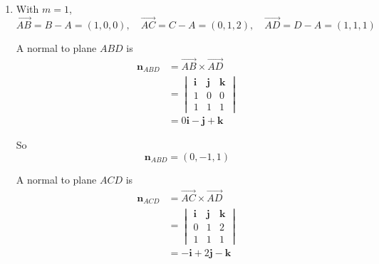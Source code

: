 \documentclass[leqno]{article}
\begin{document}
\begin{enumerate}[
  label=\textbf{\arabic*.},
  leftmargin=*,
  topsep=0pt,
  partopsep=0pt,
  parsep=0pt
]
\begin{tcolorbox}[colback=white, colframe=scarlet, title={\textbf{Solution}}, breakable, grow to left by=6mm, grow to right by=10mm]
\begin{enumerate}[label=\textbf{(\alph*)}]
Now
\begin{align*}
\overrightarrow{AC}\times\overrightarrow{AD}
&=
\begin{vmatrix}
\mathbf i & \mathbf j & \mathbf k\\
0 & 1 & 2\\
1 & 1 & 1
\end{vmatrix} \\
&=\mathbf i(1\cdot 1-2\cdot 1)-\mathbf j(0\cdot 1-2\cdot 1)+\mathbf k(0\cdot 1-1\cdot 1) \\
&=-\mathbf i+2\mathbf j-\mathbf k
\end{align*}

So
\[
\left\lvert \overrightarrow{AC}\times\overrightarrow{AD}\right\rvert=\sqrt{(-1)^2+2^2+(-1)^2}=\sqrt{6}
\]
and
\[
\left\lvert \overrightarrow{AD}\right\rvert=\sqrt{1^2+1^2+1^2}=\sqrt{3}
\]

Hence the shortest distance is
\[
\frac{\sqrt{6}}{\sqrt{3}}=\sqrt{2}
\]

So the shortest distance of \(C\) from the line through \(A\) and \(D\) is
\[
\sqrt{2}
\]

\item With \(m=1\),
\[
\overrightarrow{AB}=B-A=(1,0,0),\quad \overrightarrow{AC}=C-A=(0,1,2),\quad \overrightarrow{AD}=D-A=(1,1,1)
\]

A normal to plane \(ABD\) is
\begin{align*}
\mathbf n_{ABD}
&=\overrightarrow{AB}\times\overrightarrow{AD} \\
&=
\begin{vmatrix}
\mathbf i & \mathbf j & \mathbf k\\
1 & 0 & 0\\
1 & 1 & 1
\end{vmatrix} \\
&=0\mathbf i-\mathbf j+\mathbf k
\end{align*}

So
\[
\mathbf n_{ABD}=(0,-1,1)
\]

A normal to plane \(ACD\) is
\begin{align*}
\mathbf n_{ACD}
&=\overrightarrow{AC}\times\overrightarrow{AD} \\
&=
\begin{vmatrix}
\mathbf i & \mathbf j & \mathbf k\\
0 & 1 & 2\\
1 & 1 & 1
\end{vmatrix} \\
&=-\mathbf i+2\mathbf j-\mathbf k
\end{align*}


\end{enumerate}
\end{tcolorbox}
\end{enumerate}
\end{document}

